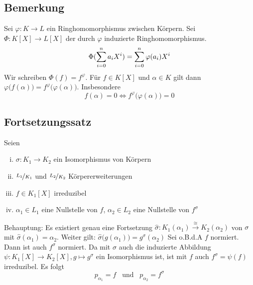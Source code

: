 \subsection[{Bemerkung: $\varphi :K \to L$ induziert Ringhomomorphismus $\Phi :L[X] \to L[X]$}]{Bemerkung} %
\label{sub:148}
Sei $\varphi : K \to L$ ein Ringhomomorphismus zwischen Körpern. Sei $\Phi : K[X] \to L[X]$ der durch $\varphi$ induzierte Ringhomomorphismus.
\[
	\Phi (\sum_{i=0}^{n} a_i X^i) = \sum_{i=0}^{n} \varphi(a_i) X^i 
\]
Wir schreiben $\Phi (f) = f^\varphi$. Für $f \in K[X]$ und $\alpha \in K$ gilt dann $\varphi\big(f(\alpha)\big) = f^\varphi \big(\varphi(\alpha)\big)$. Insbesondere
\[
	f(\alpha) =0 \iff f^\varphi \big(\varphi(\alpha)\big)=0
\]

\subsection{Fortsetzungssatz} %
\label{sub:149}
\begin{wrapfigure}[6]{R}{4cm}
\end{wrapfigure}
Seien
\begin{enumerate}[(i)]
	\item $\sigma : K_1 \to K_2$ ein Isomorphismus von Körpern
	\item $\nicefrac{L_1}{K_1}$ und $\nicefrac{L_2}{K_2}$ Körpererweiterungen
	\item $f \in K_1[X]$ irreduzibel
	\item $\alpha_1 \in L_1$ eine Nullstelle von $f$, $\alpha_2 \in L_2$ eine Nullstelle von $f^\sigma$
\end{enumerate}
Behauptung: Es existiert genau eine Fortsetzung $\hat \sigma: K_1(\alpha_1) \xrightarrow{\cong} K_2(\alpha_2) $ von $\sigma$ mit $\hat \sigma(\alpha_1)= \alpha_2$. Weiter
gilt: $\hat \sigma \big(g(\alpha_1)\big) = g^\sigma(\alpha_2)$
Sei o.B.d.A $f$ normiert. Dann ist auch $f^\sigma$ normiert. Da mit $\sigma$ auch die induzierte Abbildung $\psi : K_1[X] \to K_2[X], g \mapsto g^\sigma$ ein Isomorphismus
ist, ist mit $f$ auch $f^\sigma = \psi(f)$ irreduzibel. Es folgt 
\[
	p_{\alpha_1} = f \enspace \text{ und } \enspace p_{\alpha_2}= f^\sigma 
\]
